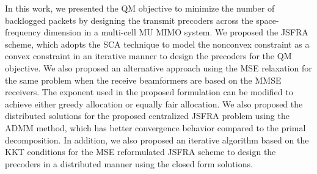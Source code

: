 
In this work, we presented the \acl{QM} objective to minimize the number of backlogged packets by designing the transmit precoders across the space-frequency dimension in a multi-cell \ac{MU} \ac{MIMO} system. We proposed the \ac{JSFRA} scheme, which adopts the \ac{SCA} technique to model the nonconvex constraint as a convex constraint in an iterative manner to design the precoders for the \acl{QM} objective. We also proposed an alternative approach using the \ac{MSE} relaxation for the same problem when the receive beamformers are based on the \ac{MMSE} receivers. The exponent used in the proposed formulation can be modified to achieve either greedy allocation or equally fair allocation. We also proposed the distributed solutions for the proposed centralized \ac{JSFRA} problem using the \ac{ADMM} method, which has better convergence behavior compared to the primal decomposition. In addition, we also proposed an iterative algorithm based on the \ac{KKT} conditions for the \ac{MSE} reformulated \ac{JSFRA} scheme to design the precoders in a distributed manner using the closed form solutions.